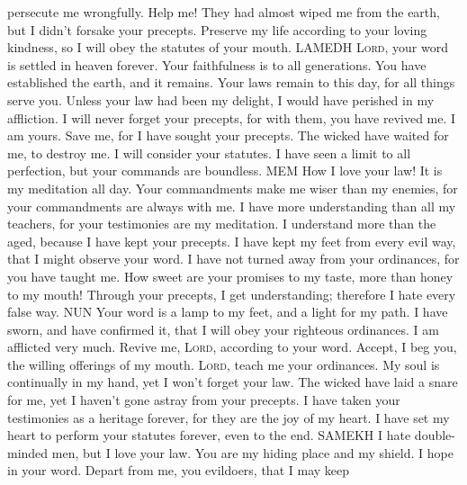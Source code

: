 persecute me wrongfully. Help me!  They had almost wiped
me from the earth, but I didn't forsake your precepts. 
Preserve my life according to your loving kindness, so I will obey the
statutes of your mouth. LAMEDH  \textsc{Lord}, your word
is settled in heaven forever.  Your faithfulness is to
all generations. You have established the earth, and it remains.
 Your laws remain to this day, for all things serve you.
 Unless your law had been my delight, I would have
perished in my affliction.  I will never forget your
precepts, for with them, you have revived me.  I am
yours. Save me, for I have sought your precepts.  The
wicked have waited for me, to destroy me. I will consider your statutes.
 I have seen a limit to all perfection, but your commands
are boundless. MEM  How I love your law! It is my
meditation all day.  Your commandments make me wiser than
my enemies, for your commandments are always with me.  I
have more understanding than all my teachers, for your testimonies are
my meditation.  I understand more than the aged, because
I have kept your precepts.  I have kept my feet from
every evil way, that I might observe your word.  I have
not turned away from your ordinances, for you have taught me.
 How sweet are your promises to my taste, more than
honey to my mouth!  Through your precepts, I get
understanding; therefore I hate every false way. NUN 
Your word is a lamp to my feet, and a light for my path.
 I have sworn, and have confirmed it, that I will obey
your righteous ordinances.  I am afflicted very much.
Revive me, \textsc{Lord}, according to your word. 
Accept, I beg you, the willing offerings of my mouth. \textsc{Lord},
teach me your ordinances.  My soul is continually in my
hand, yet I won't forget your law.  The wicked have laid
a snare for me, yet I haven't gone astray from your precepts.
 I have taken your testimonies as a heritage forever,
for they are the joy of my heart.  I have set my heart
to perform your statutes forever, even to the end. SAMEKH
 I hate double-minded men, but I love your law.
 You are my hiding place and my shield. I hope in your
word.  Depart from me, you evildoers, that I may keep
